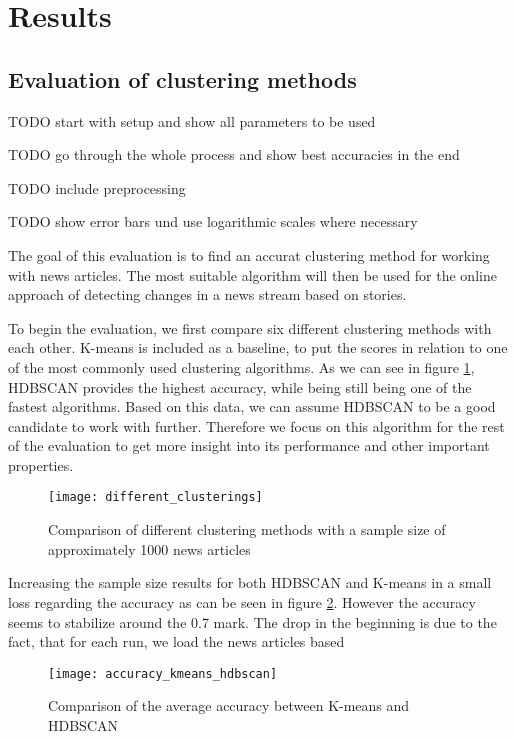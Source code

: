 \section{Results}

\subsection{Evaluation of clustering methods}

TODO start with setup and show all parameters to be used 

TODO go through the whole process and show best accuracies in the end

TODO include preprocessing

TODO show error bars und use logarithmic scales where necessary

The goal of this evaluation is to find an accurat clustering method for working with news articles. The most suitable algorithm will then be used for the online approach of detecting changes in a news stream based on stories.


To begin the evaluation, we first compare six different clustering methods with each other. K-means is included as a baseline, to put the scores in relation to one of the most commonly used clustering algorithms. As we can see in figure \ref{fig:different_clusterings}, HDBSCAN provides the highest accuracy, while being still being one of the fastest algorithms. Based on this data, we can assume HDBSCAN to be a good candidate to work with further. Therefore we focus on this algorithm for the rest of the evaluation to get more insight into its performance and other important properties.

\begin{figure}[h]
    \centering
    \texttt{[image: different\_clusterings]}
    \caption{Comparison of different clustering methods with a sample size of approximately 1000 news articles}
    \label{fig:different_clusterings}
\end{figure}


Increasing the sample size results for both HDBSCAN and K-means in a small loss regarding the accuracy as can be seen in figure \ref{fig:accuracy_kmeans_hdbscan}. However the accuracy seems to stabilize around the 0.7 mark. The drop in the beginning is due to the fact, that for each run, we load the news articles based 


\begin{figure}[h]
    \centering
    \texttt{[image: accuracy\_kmeans\_hdbscan]}
    \caption{Comparison of the average accuracy between K-means and HDBSCAN}
    \label{fig:accuracy_kmeans_hdbscan}
\end{figure}

